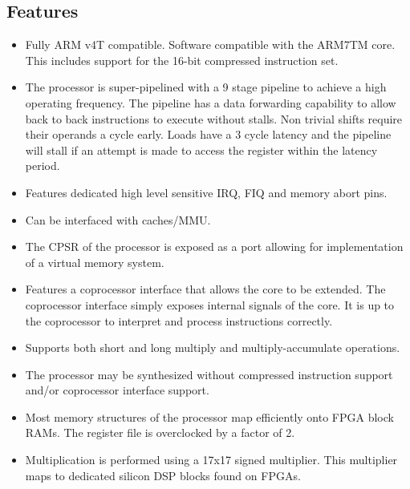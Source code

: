 \documentclass[11pt]{article}
\begin{document}

\pagebreak
\subsection{Features}

\begin{itemize}

\item Fully ARM v4T compatible. Software compatible with the ARM7TM core. This
includes support for the 16-bit compressed instruction set.

\item The processor is super-pipelined with a 9 stage pipeline to achieve a high
operating frequency. The pipeline has a data forwarding capability to allow 
back to back instructions to execute without stalls. Non trivial shifts require
their operands a cycle early. Loads have a 3 cycle latency and the pipeline
will stall if an attempt is made to access the register within the latency
period.
\item Features dedicated high level sensitive IRQ, FIQ and memory abort pins.

\item Can be interfaced with caches/MMU.

\item The CPSR of the processor is exposed as a port allowing for 
implementation of a virtual memory system.

\item Features a coprocessor interface that allows the core to be extended. The
coprocessor interface simply exposes internal signals of the core. It is up to 
the coprocessor to interpret and process instructions correctly.

\item Supports both short and long multiply and multiply-accumulate operations.

\item The processor may be synthesized without compressed instruction support
and/or coprocessor interface support.

\item Most memory structures of the processor map efficiently onto FPGA block
RAMs. The register file is overclocked by a factor of 2.

\item Multiplication is performed using a 17x17 signed multiplier. This 
multiplier maps to dedicated silicon DSP blocks found on FPGAs.


\end{itemize}
\end{document}
